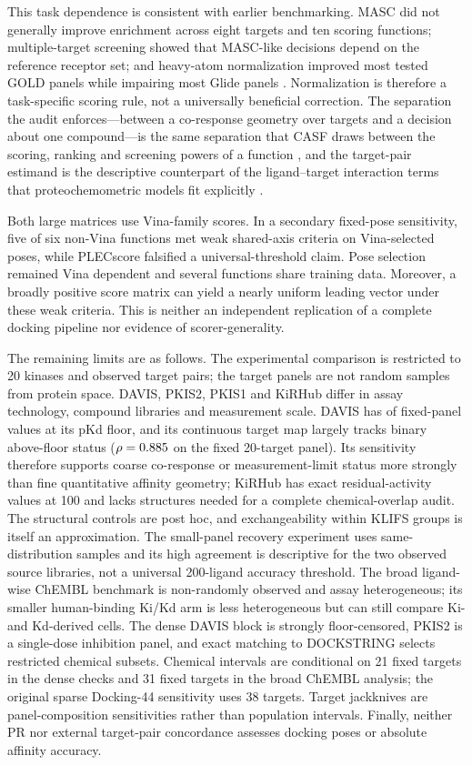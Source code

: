 \documentclass[11pt]{article}
\begin{document}
This task dependence is consistent with earlier benchmarking. MASC did not generally
improve enrichment across eight targets and ten scoring functions; multiple-target
screening showed that MASC-like decisions depend on the reference receptor set; and
heavy-atom normalization improved most tested GOLD panels while impairing most Glide
panels \cite{jacobsson2006,fukunishi2006mts,ibrahim2015}. Normalization is therefore a
task-specific scoring rule, not a universally beneficial correction. The separation the
audit enforces---between a co-response geometry over targets and a decision about one
compound---is the same separation that CASF draws between the scoring, ranking and screening
powers of a function \cite{su2019casf}, and the target-pair estimand is the descriptive
counterpart of the ligand--target interaction terms that proteochemometric models fit
explicitly \cite{cortesciriano2015,vanwesten2011}.

Both large matrices use Vina-family scores. In a secondary fixed-pose sensitivity, five of
six non-Vina functions met weak shared-axis criteria on Vina-selected poses, while PLECscore
falsified a universal-threshold claim. Pose selection remained Vina dependent and several
functions share training data. Moreover, a broadly positive score matrix can yield a nearly
uniform leading vector under these weak criteria. This is neither an independent replication
of a complete docking pipeline nor evidence of scorer-generality.

The remaining limits are as follows. The experimental
comparison is restricted to 20 kinases and observed target pairs; the target panels are not
random samples from protein space. DAVIS, PKIS2, PKIS1 and KiRHub differ in assay technology,
compound libraries and measurement scale. DAVIS has \DavisFloorPercent{} of fixed-panel values at its
pKd floor, and its continuous target map largely tracks binary above-floor status
($\rho=0.885{}$ on the fixed 20-target panel). Its sensitivity therefore
supports coarse co-response or measurement-limit status more strongly than fine quantitative
affinity geometry; KiRHub has \KiRHubCeilingPercent{} exact residual-activity
values at 100 and lacks structures needed for a complete chemical-overlap audit. The
structural controls are post hoc, and exchangeability within
KLIFS groups is itself an approximation. The small-panel recovery experiment uses
same-distribution samples and its high agreement is descriptive for the two observed source
libraries, not a universal 200-ligand accuracy threshold. The broad ligand-wise ChEMBL
benchmark is non-randomly observed and assay heterogeneous; its smaller human-binding Ki/Kd
arm is less heterogeneous but can still compare Ki- and Kd-derived cells.
The dense DAVIS block is strongly floor-censored, PKIS2 is a single-dose inhibition panel,
and exact matching to DOCKSTRING selects restricted chemical subsets. Chemical intervals
are conditional on 21 fixed targets in the dense checks and 31 fixed targets in the broad
ChEMBL analysis; the original sparse Docking-44 sensitivity uses 38 targets. Target
jackknives are panel-composition sensitivities rather than population intervals. Finally,
neither PR nor external target-pair concordance assesses docking poses or
absolute affinity accuracy.
\end{document}
